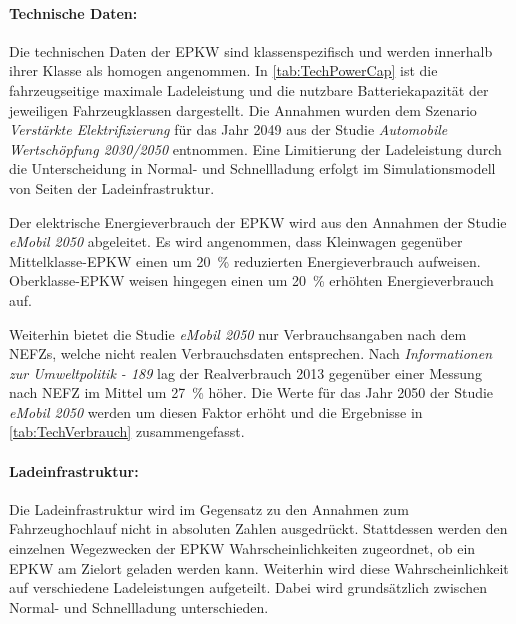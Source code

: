 


\paragraph{Technische Daten:}

Die technischen Daten der \gls{EPKW} sind klassenspezifisch und werden innerhalb ihrer Klasse als homogen angenommen.
In \autoref{tab:TechPowerCap} ist die fahrzeugseitige maximale Ladeleistung und die nutzbare Batteriekapazität der jeweiligen Fahrzeugklassen dargestellt.
Die Annahmen wurden dem Szenario \textit{Verstärkte Elektrifizierung} für das Jahr \num{2049} aus der Studie \textit{Automobile Wertschöpfung 2030/2050} \cite{Kaul2019} entnommen.
Eine Limitierung der Ladeleistung durch die Unterscheidung in Normal- und Schnellladung erfolgt im Simulationsmodell von Seiten der Ladeinfrastruktur.



Der elektrische Energieverbrauch der \gls{EPKW} wird aus den Annahmen der Studie \textit{eMobil 2050} \cite{Hacker2014} abgeleitet.
Es wird angenommen, dass Kleinwagen gegenüber Mittelklasse-\gls{EPKW} einen um \SI{20}{\percent} reduzierten Energieverbrauch aufweisen.
Oberklasse-\gls{EPKW} weisen hingegen einen um \SI{20}{\percent} erhöhten Energieverbrauch auf.\medskip

Weiterhin bietet die Studie \textit{eMobil 2050} nur Verbrauchsangaben nach dem \glspl{NEFZ}, welche nicht realen Verbrauchsdaten entsprechen.
Nach \textit{Informationen zur Umweltpolitik - 189} \cite{Heinfellner2015} lag der Realverbrauch \num{2013} gegenüber einer Messung nach \gls{NEFZ} im Mittel um \SI{27}{\percent} höher.
Die Werte für das Jahr \num{2050} der Studie \textit{eMobil 2050} werden um diesen Faktor erhöht und die Ergebnisse in \autoref{tab:TechVerbrauch} zusammengefasst.




\paragraph{Ladeinfrastruktur:}

Die Ladeinfrastruktur wird im Gegensatz zu den Annahmen zum Fahrzeughochlauf nicht in absoluten Zahlen ausgedrückt.
Stattdessen werden den einzelnen Wegezwecken der \gls{EPKW} Wahrscheinlichkeiten zugeordnet, ob ein \gls{EPKW} am Zielort geladen werden kann.
Weiterhin wird diese Wahrscheinlichkeit auf verschiedene Ladeleistungen aufgeteilt.
Dabei wird grundsätzlich zwischen Normal- und Schnellladung unterschieden.


